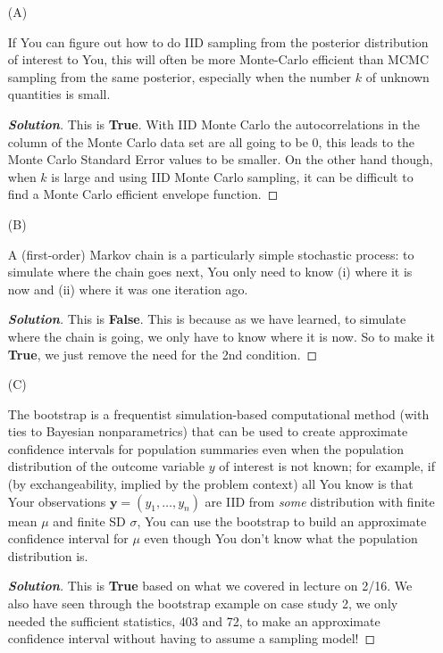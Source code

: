 \documentclass[12pt]{article}
\newenvironment{solution}{\begin{tcolorbox}[breakable]\begin{proof}[\textbf{\textit{Solution}}] }{\end{proof}\end{tcolorbox}}
\begin{document}
\begin{itemize}

\item[(A)]

If You can figure out how to do IID sampling from the posterior distribution of interest to You, this will often be more Monte-Carlo efficient than MCMC sampling from the same posterior, especially when the number $k$ of unknown quantities is small.
\begin{solution}
    This is \textbf{True}. With IID Monte Carlo the autocorrelations in the column of the Monte Carlo data set are all going to be 0, this leads to the Monte Carlo Standard Error values to be smaller. On the other hand though, when $k$ is large and using IID Monte Carlo sampling, it can be difficult to find a Monte Carlo efficient envelope function. 
\end{solution}

\item[(B)]

A (first-order) Markov chain is a particularly simple stochastic process: to simulate where the chain goes next, You only need to know (i) where it is now and (ii) where it was one iteration ago.

\begin{solution}
    This is \textbf{False}. This is because as we have learned, to simulate where the chain is going, we only have to know where it is now. So to make it \textbf{True}, we just remove the need for the 2nd condition. 
\end{solution}

\item[(C)]

The bootstrap is a frequentist simulation-based computational method (with ties to Bayesian nonparametrics) that can be used to create approximate confidence intervals for population summaries even when the population distribution of the outcome variable $y$ of interest is not known; for example, if (by exchangeability, implied by the problem context) all You know is that Your observations $\bm{ y } = ( y_1, \dots, y_n )$ are IID from \textit{some} distribution with finite mean $\mu$ and finite SD $\sigma$, You can use the bootstrap to build an approximate confidence interval for $\mu$ even though You don't know what the population distribution is.

\begin{solution}
    This is \textbf{True} based on what we covered in lecture on 2/16. We also have seen through the bootstrap example on case study 2, we only needed the sufficient statistics, 403 and 72, to make an approximate confidence interval without having to assume a sampling model!
\end{solution}


\end{itemize}
\end{document}
